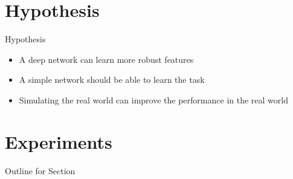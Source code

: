 \documentclass{beamer}
\begin{document}
\begin{darkframes}
%
\section{Hypothesis}
\begin{frame}{Hypothesis}
    \begin{itemize}
    	\item A deep network can learn more robust features
    	\item A simple network should be able to learn the task
    	\item Simulating the real world can improve the performance in the real world
    \end{itemize}
\end{frame}
    \section{Experiments}
        \begin{frame}{Outline for Section \thesection}
    \tableofcontents[currentsection]
\end{frame}


\end{darkframes}
\end{document}
